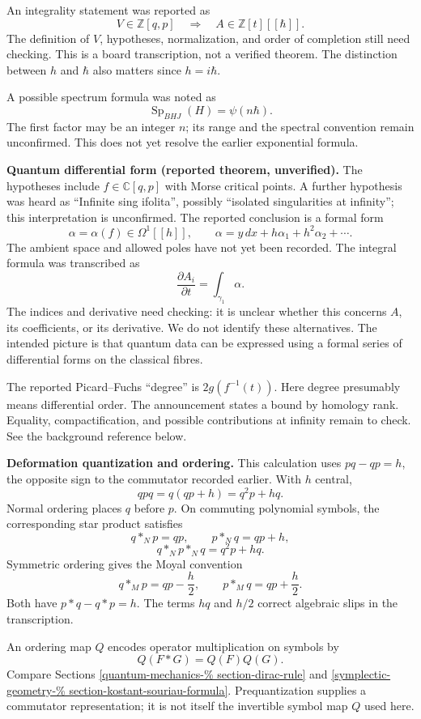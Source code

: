An integrality statement was reported as
$$
V\in\mathbb{Z}[q,p]
\quad\Longrightarrow\quad
A\in\mathbb{Z}[t][[\hbar]].
$$
The definition of $V$, hypotheses,
normalization, and order of completion
still need checking. This is a board
transcription, not a verified theorem.
The distinction between $h$ and $\hbar$
also matters since $h=i\hbar$.

A possible spectrum formula was noted as
$$
\operatorname{Sp}_{BHJ}(H)=\psi(n\hbar).
$$
The first factor may be an integer $n$;
its range and the spectral convention
remain unconfirmed. This does not yet resolve
the earlier exponential formula.

\medskip\noindent
{\bf Quantum differential form
(reported theorem, unverified).}
The hypotheses include
$f\in\mathbb{C}[q,p]$ with Morse critical
points. A further hypothesis was heard
as “Infinite sing ifolita”, possibly
“isolated singularities at infinity”;
this interpretation is unconfirmed.
The reported conclusion is a formal form
$$
\alpha=\alpha(f)\in\Omega^1[[h]],
\qquad
\alpha=y\,dx+h\alpha_1+h^2\alpha_2+\cdots.
$$
The ambient space and allowed poles
have not yet been recorded.
The integral formula was transcribed as
$$
\frac{\partial A_i}{\partial t}
=\int_{\gamma_1}\alpha.
$$
The indices and derivative need checking:
it is unclear whether this concerns
$A$, its coefficients, or its derivative.
We do not identify these alternatives.
The intended picture is that quantum
data can be expressed using a formal
series of differential forms on the
classical fibres.

The reported Picard--Fuchs “degree” is
$2g(f^{-1}(t))$. Here degree presumably
means differential order. The announcement
states a bound by homology rank.
Equality, compactification, and possible
contributions at infinity remain to check.
See the background reference below.

\medskip\noindent
{\bf Deformation quantization and ordering.}
This calculation uses $pq-qp=h$,
the opposite sign to the commutator
recorded earlier. With $h$ central,
$$
qpq=q(qp+h)=q^2p+hq.
$$
Normal ordering places $q$ before $p$.
On commuting polynomial symbols, the
corresponding star product satisfies
$$
q\ast_N p=qp,\qquad p\ast_N q=qp+h,
$$
$$
q\ast_N p\ast_N q=q^2p+hq.
$$
Symmetric ordering gives the Moyal
convention
$$
q\ast_M p=qp-\frac{h}{2},
\qquad
p\ast_M q=qp+\frac{h}{2}.
$$
Both have $p\ast q-q\ast p=h$.
The terms $hq$ and $h/2$ correct
algebraic slips in the transcription.

An ordering map $Q$ encodes operator
multiplication on symbols by
$$
Q(F\ast G)=Q(F)Q(G).
$$
Compare Sections
\ref{quantum-mechanics-%
section-dirac-rule} and
\ref{symplectic-geometry-%
section-kostant-souriau-formula}.
Prequantization supplies a commutator
representation; it is not itself the
invertible symbol map $Q$ used here.

